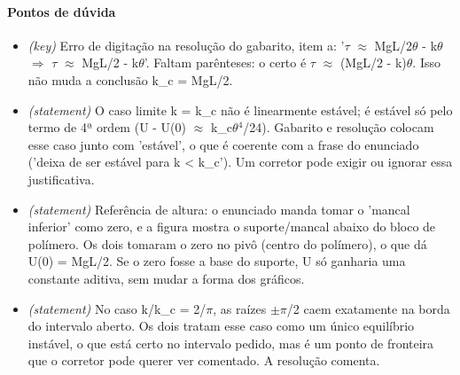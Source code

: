\documentclass{article}%
\begin{document}
\paragraph{Pontos de dúvida}%
\begin{itemize}%
\item%
\textit{(key)} Erro de digitação na resolução do gabarito, item a: '$\tau$ $\approx$ MgL/2$\theta$ - k$\theta$ $\Rightarrow$ $\tau$ $\approx$ MgL/2 - k$\theta$'. Faltam parênteses: o certo é $\tau$ $\approx$ (MgL/2 - k)$\theta$. Isso não muda a conclusão k\_c = MgL/2.%
\item%
\textit{(statement)} O caso limite k = k\_c não é linearmente estável; é estável só pelo termo de 4ª ordem (U - U(0) $\approx$ k\_c$\theta$$^{4}$/24). Gabarito e resolução colocam esse caso junto com 'estável', o que é coerente com a frase do enunciado ('deixa de ser estável para k < k\_c'). Um corretor pode exigir ou ignorar essa justificativa.%
\item%
\textit{(statement)} Referência de altura: o enunciado manda tomar o 'mancal inferior' como zero, e a figura mostra o suporte/mancal abaixo do bloco de polímero. Os dois tomaram o zero no pivô (centro do polímero), o que dá U(0) = MgL/2. Se o zero fosse a base do suporte, U só ganharia uma constante aditiva, sem mudar a forma dos gráficos.%
\item%
\textit{(statement)} No caso k/k\_c = 2/$\pi$, as raízes $\pm$$\pi$/2 caem exatamente na borda do intervalo aberto. Os dois tratam esse caso como um único equilíbrio instável, o que está certo no intervalo pedido, mas é um ponto de fronteira que o corretor pode querer ver comentado. A resolução comenta.%
\end{itemize}%
\end{document}
